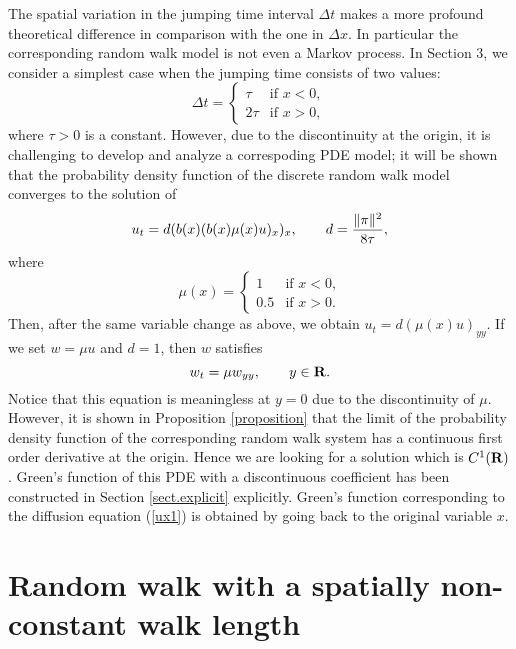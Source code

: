 \documentclass[11pt]{amsart}
\def\R{{\bf R}}
\def\R{{\bf R}}
\begin{document}
The spatial variation in the jumping time interval $\Delta t$ makes a more profound theoretical difference in comparison with the one in $\Delta x$. In particular the corresponding random walk model is not even a Markov process. In Section 3, we consider a simplest case when the jumping time consists of two values:
$$
\Delta t=
\begin{cases}
\tau & \text{if $x<0$,}\\
2\tau & \text{if $x>0$},
\end{cases}
$$
where $\tau>0$ is a constant. However, due to the discontinuity at the origin, it is challenging to develop and analyze a correspoding PDE model; it will be shown that the probability density function of the discrete random walk model converges to the solution of
\begin{equation}\label{ux1}
u_t=d(b(x)(b(x)\mu(x)u)_x)_x,\qquad d={\|\pi\|^2\over 8\tau},
\end{equation}
where
\begin{equation}\label{mu(x)}
\mu(x)=\begin{cases}
1 & \text{if $x<0$,}\\
0.5& \text{if $x>0$}.
\end{cases}
\end{equation}
Then, after the same variable change as above, we obtain $u_t=d(\mu(x)u)_{yy}$. If we set $w=\mu u$ and $d=1$, then $w$ satisfies
$$
w_t=\mu w_{yy},\qquad y\in\R.
$$
Notice that this equation is meaningless at $y=0$ due to the discontinuity of $\mu$. However, it is shown in Proposition \ref{proposition} that the limit of the probability density function of the corresponding random walk system has a continuous first order derivative at the origin. Hence we are looking for a solution which is $C^1(\R)$. Green's function of this PDE with a discontinuous coefficient has been constructed in Section \ref{sect.explicit} explicitly. Green's function corresponding to the diffusion equation (\ref{ux1}) is obtained by going back to the original variable $x$.


\newpage
\section{Random walk with a spatially non-constant walk length}
\end{document}
